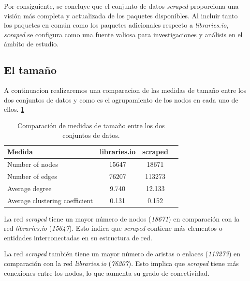 Por consiguiente, se concluye que el conjunto de datos \textit{scraped} proporciona una
visión más completa y actualizada de los paquetes disponibles. Al incluir tanto los paquetes
en común como los paquetes adicionales respecto a \textit{libraries.io}, \textit{scraped}
se configura como una fuente valiosa para investigaciones y análisis en el ámbito de estudio.






\subsection{El tamaño}

A continuacion realizaremos una comparacion de las medidas de tamaño entre los dos conjuntos de datos y como es
el agrupamiento de los nodos en cada uno de ellos. \ref{tab:cran_size}

\begin{table}[h!]
    \begin{center}
        \begin{tabular}{|l|c|c|c|}
            \hline
            \textbf{Medida}                & \textbf{libraries.io} & \textbf{scraped} \\
            \hline
            Number of nodes                & 15647                 & 18671            \\
            Number of edges                & 76207                 & 113273           \\
            Average degree                 & 9.740                 & 12.133           \\
            Average clustering coefficient & 0.131                 & 0.152            \\
            \hline
        \end{tabular}
        \caption{Comparación de medidas de tamaño entre los dos conjuntos de datos.}
        \label{tab:cran_size}
    \end{center}
\end{table}

La red \textit{scraped} tiene un mayor número de nodos (\textit{18671}) en comparación con la
red \textit{libraries.io} (\textit{15647}). Esto indica que \textit{scraped} contiene más elementos o entidades
interconectadas en su estructura de red.

La red \textit{scraped} también tiene un mayor número de aristas o enlaces (\textit{113273}) en
comparación con la red \textit{libraries.io} (\textit{76207}). Esto implica que \textit{scraped} tiene más
conexiones entre los nodos, lo que aumenta su grado de conectividad.

